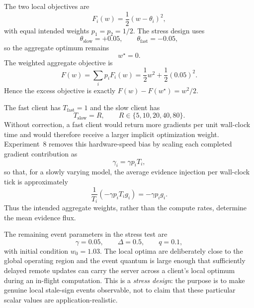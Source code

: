 The two local objectives are
\begin{equation}
  F_i(w)=\frac12(w-\theta_i)^2,
\end{equation}
with equal intended weights $p_1=p_2=1/2$. The stress design uses
\begin{equation}
  \theta_{\mathrm{slow}}=+0.05,
  \qquad
  \theta_{\mathrm{fast}}=-0.05,
\end{equation}
so the aggregate optimum remains
\begin{equation}
  w^\star=0.
\end{equation}
The weighted aggregate objective is
\begin{equation}
  F(w)=\sum_i p_iF_i(w)
      =\frac12 w^2+\frac12(0.05)^2.
\end{equation}
Hence the excess objective is exactly $F(w)-F(w^\star)=w^2/2$.

The fast client has $T_{\mathrm{fast}}=1$ and the slow client has
\begin{equation}
  T_{\mathrm{slow}}=R,
  \qquad
  R\in\{5,10,20,40,80\}.
\end{equation}
Without correction, a fast client would return more gradients per unit wall-clock time and would therefore receive a larger implicit optimization weight. Experiment~8 removes this hardware-speed bias by scaling each completed gradient contribution as
\begin{equation}
  \gamma_i=\gamma p_iT_i,
\end{equation}
so that, for a slowly varying model, the average evidence injection per wall-clock tick is approximately
\begin{equation}
  \frac{1}{T_i}\left(-\gamma p_iT_i g_i\right)
  =-\gamma p_i g_i.
\end{equation}
Thus the intended aggregate weights, rather than the compute rates, determine the mean evidence flux.

The remaining event parameters in the stress test are
\begin{equation}
  \gamma=0.05,\qquad
  \Delta=0.5,\qquad
  q=0.1,
\end{equation}
with initial condition $w_0=1.03$. The local optima are deliberately close to the global operating region and the event quantum is large enough that sufficiently delayed remote updates can carry the server across a client's local optimum during an in-flight computation. This is a \emph{stress design}: the purpose is to make genuine local stale-sign events observable, not to claim that these particular scalar values are application-realistic.

